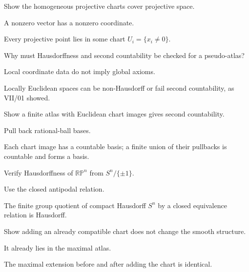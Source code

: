 \begin{exercise}\label{exr:vii02-15}
Show the homogeneous projective charts cover projective space.
\end{exercise}
\begin{hint}
A nonzero vector has a nonzero coordinate.
\end{hint}
\begin{solution}
Every projective point lies in some chart \(U_i=\{x_i\neq0\}\).
\end{solution}

\begin{exercise}\label{exr:vii02-16}
Why must Hausdorffness and second countability be checked for a pseudo-atlas?
\end{exercise}
\begin{hint}
Local coordinate data do not imply global axioms.
\end{hint}
\begin{solution}
Locally Euclidean spaces can be non-Hausdorff or fail second countability, as VII/01 showed.
\end{solution}

\begin{exercise}\label{exr:vii02-17}
Show a finite atlas with Euclidean chart images gives second countability.
\end{exercise}
\begin{hint}
Pull back rational-ball bases.
\end{hint}
\begin{solution}
Each chart image has a countable basis; a finite union of their pullbacks is countable and forms a basis.
\end{solution}

\begin{exercise}\label{exr:vii02-18}
Verify Hausdorffness of \(\mathbb{RP}^n\) from \(S^n/\{\pm1\}\).
\end{exercise}
\begin{hint}
Use the closed antipodal relation.
\end{hint}
\begin{solution}
The finite group quotient of compact Hausdorff \(S^n\) by a closed equivalence relation is Hausdorff.
\end{solution}

\begin{exercise}\label{exr:vii02-19}
Show adding an already compatible chart does not change the smooth structure.
\end{exercise}
\begin{hint}
It already lies in the maximal atlas.
\end{hint}
\begin{solution}
The maximal extension before and after adding the chart is identical.
\end{solution}

